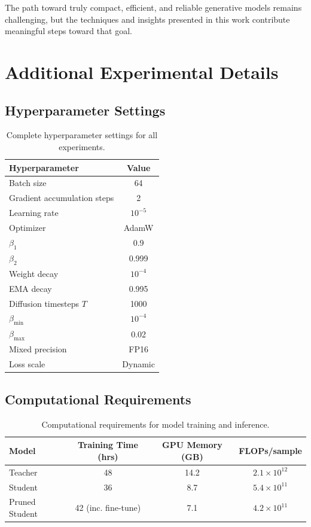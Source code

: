 \documentclass[12pt]{report}
\theoremstyle{definition}
\begin{document}
The path toward truly compact, efficient, and reliable generative models remains challenging, but the techniques and insights presented in this work contribute meaningful steps toward that goal.

\nocite{*}



\appendix

\chapter{Additional Experimental Details}

\section{Hyperparameter Settings}

\begin{table}[H]
\centering
\begin{tabular}{lc}
\toprule
\textbf{Hyperparameter} & \textbf{Value} \\
\midrule
Batch size & 64 \\
Gradient accumulation steps & 2 \\
Learning rate & $10^{-5}$ \\
Optimizer & AdamW \\
$\beta_1$ & 0.9 \\
$\beta_2$ & 0.999 \\
Weight decay & $10^{-4}$ \\
EMA decay & 0.995 \\
Diffusion timesteps $T$ & 1000 \\
$\beta_{\min}$ & $10^{-4}$ \\
$\beta_{\max}$ & 0.02 \\
Mixed precision & FP16 \\
Loss scale & Dynamic \\
\bottomrule
\end{tabular}
\caption{Complete hyperparameter settings for all experiments.}
\end{table}

\section{Computational Requirements}

\begin{table}[H]
\centering
\begin{tabular}{lccc}
\toprule
\textbf{Model} & \textbf{Training Time (hrs)} & \textbf{GPU Memory (GB)} & \textbf{FLOPs/sample} \\
\midrule
Teacher & 48 & 14.2 & $2.1 \times 10^{12}$ \\
Student & 36 & 8.7 & $5.4 \times 10^{11}$ \\
Pruned Student & 42 (inc. fine-tune) & 7.1 & $4.2 \times 10^{11}$ \\
\bottomrule
\end{tabular}
\caption{Computational requirements for model training and inference.}
\end{table}
\end{document}
